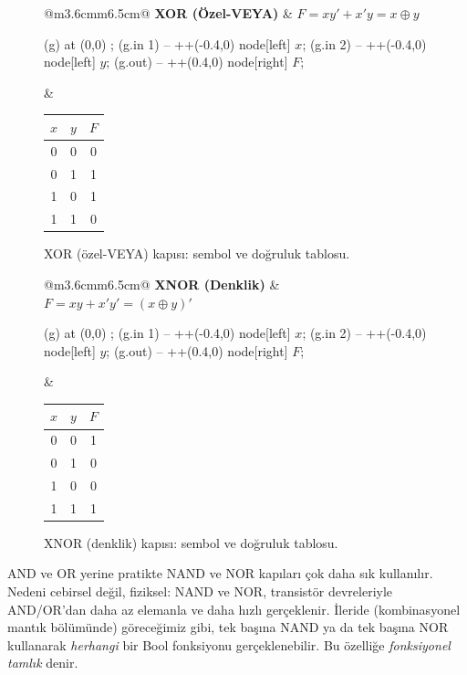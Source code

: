 \begin{figure}[H]
\centering
\begin{tabular}{@{}m{3.6cm}m{6.5cm}@{}}
\textbf{XOR (Özel-VEYA)} &
$F=xy'+x'y=x\oplus y$ \\
\begin{circuitikz}[scale=0.8]
 (g) at (0,0) {};
\draw (g.in 1) -- ++(-0.4,0) node[left] {$x$};
\draw (g.in 2) -- ++(-0.4,0) node[left] {$y$};
\draw (g.out) -- ++(0.4,0) node[right] {$F$};
\end{circuitikz}
&
\begin{tabular}{cc|c}
\toprule
$x$&$y$&$F$\\
\midrule
0&0&0\\0&1&1\\1&0&1\\1&1&0\\
\bottomrule
\end{tabular}
\end{tabular}
\caption{XOR (özel-VEYA) kapısı: sembol ve doğruluk tablosu.}
\label{fig:kapi-xor}
\end{figure}

\begin{figure}[H]
\centering
\begin{tabular}{@{}m{3.6cm}m{6.5cm}@{}}
\textbf{XNOR (Denklik)} &
$F=xy+x'y'=(x\oplus y)'$ \\
\begin{circuitikz}[scale=0.8]
\node[xnor port, line width=0.4pt] (g) at (0,0) {};
\draw (g.in 1) -- ++(-0.4,0) node[left] {$x$};
\draw (g.in 2) -- ++(-0.4,0) node[left] {$y$};
\draw (g.out) -- ++(0.4,0) node[right] {$F$};
\end{circuitikz}
&
\begin{tabular}{cc|c}
\toprule
$x$&$y$&$F$\\
\midrule
0&0&1\\0&1&0\\1&0&0\\1&1&1\\
\bottomrule
\end{tabular}
\end{tabular}
\caption{XNOR (denklik) kapısı: sembol ve doğruluk tablosu.}
\label{fig:kapi-xnor}
\end{figure}

\begin{bilginot}
AND ve OR yerine pratikte NAND ve NOR kapıları çok daha sık kullanılır. Nedeni cebirsel
değil, fiziksel: NAND ve NOR, transistör devreleriyle AND/OR'dan daha az elemanla ve daha
hızlı gerçeklenir. İleride (kombinasyonel mantık bölümünde) göreceğimiz gibi, tek başına
NAND ya da tek başına NOR kullanarak \emph{herhangi} bir Bool fonksiyonu gerçeklenebilir.
Bu özelliğe \emph{fonksiyonel tamlık} denir.
\end{bilginot}

